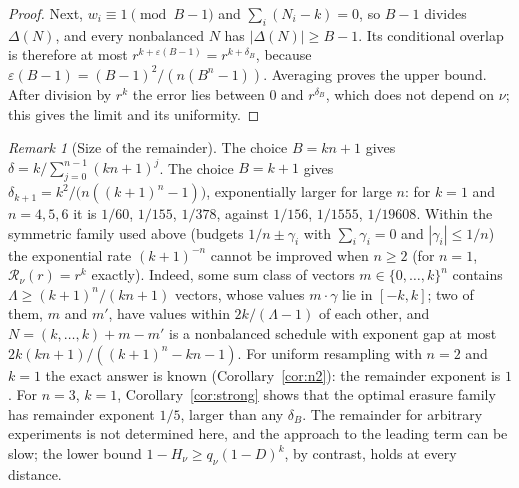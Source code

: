 \documentclass[11pt,a4paper]{article}
\theoremstyle{definition}\newtheorem{definition}[theorem]{Definition}
\theoremstyle{remark}\newtheorem{remark}[theorem]{Remark}
\begin{document}
\begin{proof}
Next, $w_i\equiv1\pmod{B-1}$ and $\sum_i(N_i-k)=0$, so $B-1$ divides $\Delta(N)$, and every nonbalanced $N$ has $|\Delta(N)|\ge B-1$. Its conditional overlap is therefore at most $r^{k+\varepsilon(B-1)}=r^{k+\delta_B}$, because $\varepsilon(B-1)=(B-1)^2/(n(B^n-1))$. Averaging proves the upper bound. After division by $r^k$ the error lies between $0$ and $r^{\delta_B}$, which does not depend on $\nu$; this gives the limit and its uniformity.
\end{proof}

\begin{remark}[Size of the remainder]\label{rem:delta}
The choice $B=kn+1$ gives $\delta=k/\sum_{j=0}^{n-1}(kn+1)^j$. The choice $B=k+1$ gives
$\delta_{k+1}=k^2/\bigl(n((k+1)^n-1)\bigr)$, exponentially larger for large $n$: for $k=1$ and $n=4,5,6$ it is $1/60$, $1/155$, $1/378$, against $1/156$, $1/1555$, $1/19608$. Within the symmetric family used above (budgets $1/n\pm\gamma_i$ with $\sum_i\gamma_i=0$ and $|\gamma_i|\le1/n$) the exponential rate $(k+1)^{-n}$ cannot be improved when $n\ge2$ (for $n=1$, $\mathcal R_\nu(r)=r^k$ exactly). Indeed, some sum class of vectors $m\in\{0,\ldots,k\}^n$ contains $\Lambda\ge(k+1)^n/(kn+1)$ vectors, whose values $m\cdot\gamma$ lie in $[-k,k]$; two of them, $m$ and $m'$, have values within $2k/(\Lambda-1)$ of each other, and $N=(k,\ldots,k)+m-m'$ is a nonbalanced schedule with exponent gap at most $2k(kn+1)/((k+1)^n-kn-1)$. For uniform resampling with $n=2$ and $k=1$ the exact answer is known (Corollary~\ref{cor:n2}): the remainder exponent is $1$. For $n=3$, $k=1$, Corollary~\ref{cor:strong} shows that the optimal erasure family has remainder exponent $1/5$, larger than any $\delta_B$. The remainder for arbitrary experiments is not determined here, and the approach to the leading term can be slow; the lower bound $1-H_\nu\ge q_\nu(1-D)^k$, by contrast, holds at every distance.
\end{remark}
\end{document}
